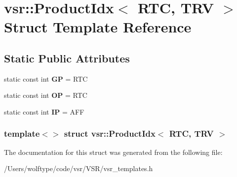 \hypertarget{structvsr_1_1_product_idx_3_01_r_t_c_00_01_t_r_v_01_4}{\section{vsr\-:\-:Product\-Idx$<$ R\-T\-C, T\-R\-V $>$ Struct Template Reference}
\label{structvsr_1_1_product_idx_3_01_r_t_c_00_01_t_r_v_01_4}
}
\subsection*{Static Public Attributes}
\begin{DoxyCompactItemize}
\item 
\hypertarget{structvsr_1_1_product_idx_3_01_r_t_c_00_01_t_r_v_01_4_ac24f98fbdf37244979e2f9b444d129d6}{static const int {\bfseries G\-P} = R\-T\-C}\label{structvsr_1_1_product_idx_3_01_r_t_c_00_01_t_r_v_01_4_ac24f98fbdf37244979e2f9b444d129d6}

\item 
\hypertarget{structvsr_1_1_product_idx_3_01_r_t_c_00_01_t_r_v_01_4_a22338fd9743bde404bf7f04c2fa337c2}{static const int {\bfseries O\-P} = R\-T\-C}\label{structvsr_1_1_product_idx_3_01_r_t_c_00_01_t_r_v_01_4_a22338fd9743bde404bf7f04c2fa337c2}

\item 
\hypertarget{structvsr_1_1_product_idx_3_01_r_t_c_00_01_t_r_v_01_4_a2d40867a50fd5b802f5c397620863f12}{static const int {\bfseries I\-P} = A\-F\-F}\label{structvsr_1_1_product_idx_3_01_r_t_c_00_01_t_r_v_01_4_a2d40867a50fd5b802f5c397620863f12}

\end{DoxyCompactItemize}
\subsubsection*{template$<$$>$ struct vsr\-::\-Product\-Idx$<$ R\-T\-C, T\-R\-V $>$}



The documentation for this struct was generated from the following file\-:\begin{DoxyCompactItemize}
\item 
/\-Users/wolftype/code/vsr/\-V\-S\-R/vsr\-\_\-templates.\-h\end{DoxyCompactItemize}
